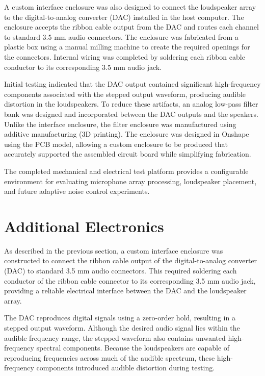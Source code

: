 A custom interface enclosure was also designed to connect the loudspeaker array to the digital-to-analog converter (DAC) installed in the host computer. The enclosure accepts the ribbon cable output from the DAC and routes each channel to standard 3.5 mm audio connectors. The enclosure was fabricated from a plastic box using a manual milling machine to create the required openings for the connectors. Internal wiring was completed by soldering each ribbon cable conductor to its corresponding 3.5 mm audio jack.

Initial testing indicated that the DAC output contained significant high-frequency components associated with the stepped output waveform, producing audible distortion in the loudspeakers. To reduce these artifacts, an analog low-pass filter bank was designed and incorporated between the DAC outputs and the speakers. Unlike the interface enclosure, the filter enclosure was manufactured using additive manufacturing (3D printing). The enclosure was designed in Onshape using the PCB model, allowing a custom enclosure to be produced that accurately supported the assembled circuit board while simplifying fabrication.

The completed mechanical and electrical test platform provides a configurable environment for evaluating microphone array processing, loudspeaker placement, and future adaptive noise control experiments.

\section{Additional Electronics}

As described in the previous section, a custom interface enclosure was constructed to connect the ribbon cable output of the digital-to-analog converter (DAC) to standard 3.5 mm audio connectors. This required soldering each conductor of the ribbon cable connector to its corresponding 3.5 mm audio jack, providing a reliable electrical interface between the DAC and the loudspeaker array.

The DAC reproduces digital signals using a zero-order hold, resulting in a stepped output waveform. Although the desired audio signal lies within the audible frequency range, the stepped waveform also contains unwanted high-frequency spectral components. Because the loudspeakers are capable of reproducing frequencies across much of the audible spectrum, these high-frequency components introduced audible distortion during testing.

